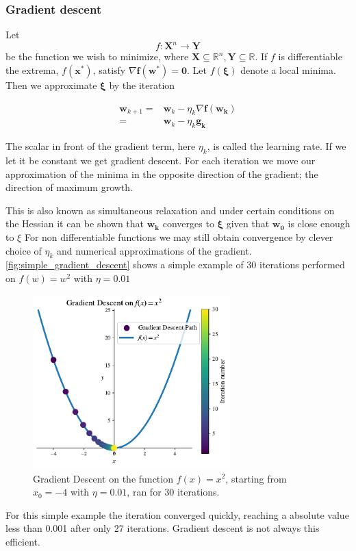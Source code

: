 \documentclass{article}
\theoremstyle{definition}
\begin{document}
\subsubsection{Gradient descent}

Let  $$f: \mathbf{X}^n \rightarrow \mathbf{Y}$$ be the function we wish to minimize, where $ \mathbf{X} \subseteq \mathbb{R}^n, \mathbf{Y}\subseteq \mathbb{R}$. If $f$ is differentiable the extrema, $f(\mathbf{x^*})$, satisfy $\nabla \mathbf{f(w^*)} = \mathbf{0}$. Let $f(\boldsymbol{\xi})$ denote a local minima. Then we approximate $\boldsymbol{\xi}$ by the iteration

\begin{equation}
\begin{aligned} 
    \mathbf{w}_{k+1} =& \mathbf{w}_k - \eta_k \nabla  \mathbf{f(\mathbf{w}_k)}\\
    =& \mathbf{w}_k - \eta_k  \mathbf{g_k} 
\end{aligned}
\label{eq:gradient_descent}
\end{equation}

The scalar in front of the gradient term, here $\eta_k$, is called the learning rate. If we let it be constant we get gradient descent. For each iteration we move our approximation of the minima in the opposite direction of the gradient; the direction of maximum growth. 

This is also known as simultaneous relaxation and under certain conditions on the Hessian it can be shown that 
$\mathbf{w_k}$ converges to $\mathbf{\xi}$  given that $\mathbf{w_0}$ is close enough to $\xi$ \parencite[p.~117--118]{introNumeric}
For non differentiable functions we may still obtain convergence by clever choice of $\eta_k$ and numerical approximations of the gradient. 
\autoref{fig:simple_gradient_descent} shows a simple example of 30 iterations performed on $f(w) = w^2$ with $\eta = 0.01$

\begin{figure}[H]
    \centering
    \includegraphics[width=0.68\textwidth]{figures/simple_gradient_descent_x^2.pdf}
    \caption{Gradient Descent on the function $f(x)=x^2$, starting from $x_0 = -4$ with $\eta = 0.01$, ran for 30 iterations.}
    \label{fig:simple_gradient_descent}
\end{figure}
For this simple example the iteration converged quickly, reaching a absolute value less than 0.001 after only 27 iterations. Gradient descent is not always this efficient. 
\end{document}

